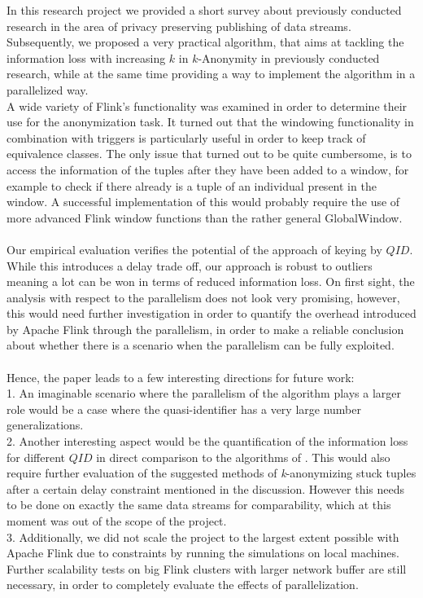 \noindent In this research project we provided a short survey about previously conducted research in the area of privacy preserving publishing of data streams. Subsequently, we proposed a very practical algorithm, that aims at tackling the information loss with increasing $k$ in $k$-Anonymity in previously conducted research, while at the same time providing a way to implement the algorithm in a parallelized way. \\
A wide variety of Flink's functionality was examined in order to determine their use for the anonymization task. It turned out that the windowing functionality in combination with triggers is particularly useful in order to keep track of equivalence classes. The only issue that turned out to be quite cumbersome, is to access the information of the tuples after they have been added to a window, for example to check if there already is a tuple of an individual present in the window. A successful implementation of this would probably require the  use of more advanced Flink window functions than the rather general GlobalWindow. \\
\\
Our empirical evaluation verifies the potential of the approach of keying by $QID$. While this introduces a delay trade off, our approach is robust to outliers meaning a lot can be won in terms of reduced information loss. On first sight, the analysis with respect to the parallelism does not look very promising, however, this would need further investigation in order to quantify the overhead introduced by Apache Flink through the parallelism, in order to make a reliable conclusion about whether there is a scenario when the parallelism can be fully exploited.\\
\\
Hence, the paper leads to a few interesting directions for future work:\\
1. An imaginable scenario where the parallelism of the algorithm plays a larger role would be a case where the quasi-identifier has a very large number generalizations. \\
2. Another interesting aspect would be the quantification of the information loss for different $QID$ in direct comparison to the algorithms of . This would also require further evaluation of the suggested methods of \textit{k}-anonymizing stuck tuples after a certain delay constraint mentioned in the discussion. However this needs to be done on exactly the same data streams for comparability, which at this moment was out of the scope of the project. \\
3. Additionally, we did not scale the project to the largest extent possible with Apache Flink due to constraints by running the simulations on local machines. Further scalability tests on big Flink clusters with larger network buffer are still necessary, in order to completely evaluate the effects of parallelization.